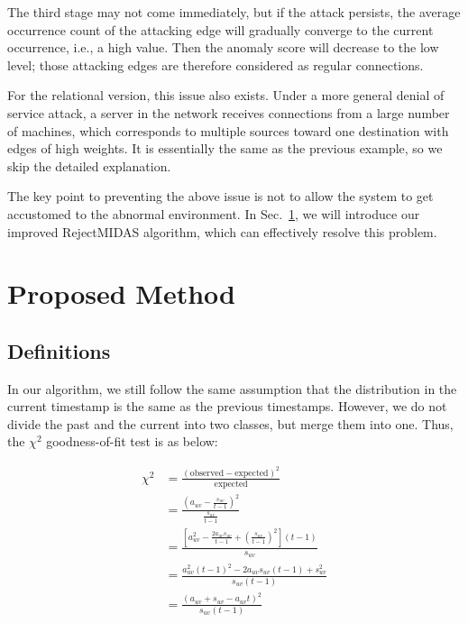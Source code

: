 \documentclass[5p]{elsarticle}
\begin{document}
	The third stage may not come immediately, but if the attack persists, the average occurrence count of the attacking edge will gradually converge to the current occurrence, i.e., a high value. Then the anomaly score will decrease to the low level; those attacking edges are therefore considered as regular connections.

	For the relational version, this issue also exists. Under a more general denial of service attack, a server in the network receives connections from a large number of machines, which corresponds to multiple sources toward one destination with edges of high weights. It is essentially the same as the previous example, so we skip the detailed explanation.

	The key point to preventing the above issue is not to allow the system to get accustomed to the abnormal environment. In Sec.~\ref{sec:ProposedMethod}, we will introduce our improved RejectMIDAS algorithm, which can effectively resolve this problem.


	\section{Proposed Method}\label{sec:ProposedMethod}

	\subsection{Definitions}

	In our algorithm, we still follow the same assumption that the distribution in the current timestamp is the same as the previous timestamps. However, we do not divide the past and the current into two classes, but merge them into one. Thus, the $\chi^2$ goodness-of-fit test is as below:

	\begin{align*}
		\chi^2&=\frac{(\text{observed}-\text{expected})^2}{\text{expected}} \\
		&=\frac{\displaystyle\left(a_{uv}-\frac{s_{uv}}{t-1}\right)^2}{\displaystyle\frac{s_{uv}}{t-1}} \\
		&=\frac{\displaystyle\left[a_{uv}^2-\frac{2a_{uv}s_{uv}}{t-1}+\left(\frac{s_{uv}}{t-1}\right)^2\right](t-1)}{\displaystyle s_{uv}} \\
		&=\frac{\displaystyle a_{uv}^2(t-1)^2-2a_{uv}s_{uv}(t-1)+s_{uv}^2}{\displaystyle s_{uv}(t-1)} \\
		&=\frac{(a_{uv}+s_{uv}-a_{uv}t)^2}{s_{uv}(t-1)} \\
	\end{align*}
\end{document}
